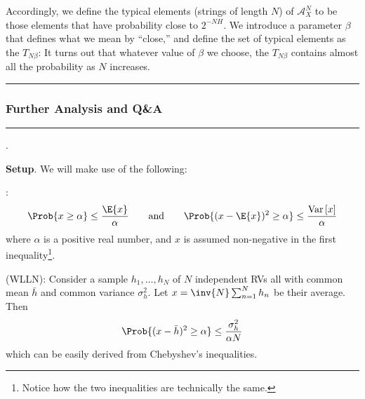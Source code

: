 \documentclass[11pt]{article}
\renewcommand\vec[2][]{\bm{#2}_{#1}}
\newcommand\myspace[1][]{\vspace{#1\bigskipamount}}
\newcommand\p{\Needspace{10\baselineskip} \noindent}
\newcommand\Var[1]{\mathrm{Var}\left[#1\right]}
\newcommand\subsub[1]{\Needspace{15\baselineskip}\hrule\subsubsection{#1}\hrule}
\begin{document}
Accordingly, we define the typical elements (strings of length $N$) of $\mathcal{A}_X^N$ to be those elements that have probability close to $2^{-NH}$. We introduce a parameter $\beta$ that defines what we mean by ``close,'' and define the set of typical elements as the  $T_{N\beta}$:
\graybox{
	T_{N\beta} &\triangleq \left\{
		\vec x \in \mathcal{A}_X^N: \left| \inv{N}\lg\inv{P(\vec x)} - H \right| < \beta 
		\right\} \label{typical-set}
}
It turns out that whatever value of $\beta$ we choose, the $T_{N\beta}$ contains almost all the probability as $N$ increases.



\myspace
\subsub{Further Analysis and Q\&A}
\myspace

\myspace
\p {}.
\begin{compactitem}
	\item \textbf{Setup}. We will make use of the following:
	\begin{compactitem}
		\item {}:
		\begin{align}
		\Prob{x \ge \alpha} \le \frac{  \E{x}   }{  \alpha  }
		\qquad \text{and} \qquad
		\Prob{ (x - \E{x})^2 \ge \alpha } \le \frac{\Var{x}}{\alpha}
		\end{align}
		where $\alpha$ is a positive real number, and $x$ is assumed non-negative in the first inequality\footnote{Notice how the two inequalities are technically the same.}.
		
		
		\item {} (WLLN): Consider a sample $h_1, \ldots, h_N$ of $N$ independent RVs all with common mean $\bar h$ and common variance $\sigma_h^2$. Let $x = \inv{N}\sum_{n=1}^{N} h_n$ be their average. Then
		\begin{align}
			\Prob{ (x - \bar h)^2 \ge \alpha } \le \frac{\sigma_h^2}{\alpha N}
		\end{align}
		which can be easily derived from Chebyshev's inequalities.
	\end{compactitem}
	

\end{compactitem}
\end{document}
